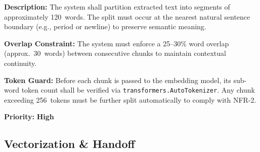 \documentclass[12pt, a4paper]{article}
\begin{document}
\vspace{0.4cm}

\begin{tcolorbox}[enhanced, colback=white, colframe=ctPurple,
    colbacktitle=ctLightPurple, coltitle=ctPurple, boxrule=0.5pt,
    leftrule=4pt, arc=2mm, fonttitle=\large\bfseries,
    title={FR-2: Sentence-Aware Chunking},
    drop fuzzy shadow=black!5!white, top=2pt, bottom=2pt]
\begin{prolist}
    \item \textbf{Description:} The system shall partition extracted text
    into segments of approximately 120~words. The split must occur at the
    nearest natural sentence boundary (e.g., period or newline) to preserve
    semantic meaning.

    \item \textbf{Overlap Constraint:} The system must enforce a 25--30\%
    word overlap (approx.\ 30~words) between consecutive chunks to maintain
    contextual continuity.

    \item \textbf{Token Guard:} Before each chunk is passed to the embedding
    model, its sub-word token count shall be verified via
    \texttt{transformers.AutoTokenizer}. Any chunk exceeding 256~tokens must
    be further split automatically to comply with NFR-2.

    \item \textbf{Priority:} \textcolor{alertRed}{\textbf{High}}
\end{prolist}
\end{tcolorbox}

\vspace{0.5cm}
\subsection{Vectorization \& Handoff}
\vspace{0.3cm}
\end{document}
